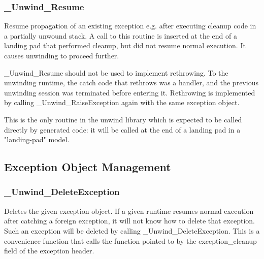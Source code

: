 \subsubsection{\_Unwind\_Resume}


Resume propagation of an existing exception e.g. after executing cleanup
code in a partially unwound stack. A call to this routine is inserted
at the end of a landing pad that performed cleanup, but did not resume
normal execution. It causes unwinding to proceed further.

\_Unwind\_Resume should not be used to implement rethrowing.  To the
unwinding runtime, the catch code that rethrows was a handler, and the
previous unwinding session was terminated before entering it. Rethrowing
is implemented by calling \_Unwind\_RaiseException again with the same
exception object.

This is the only routine in the unwind library which is expected 
to be called directly by generated code: it will be called at the 
end of a landing pad in a "landing-pad" model. 

\subsection{Exception Object Management}

\subsubsection{\_Unwind\_DeleteException}


Deletes the given exception object. If a given runtime resumes normal
execution after catching a foreign exception, it will not know how to
delete that exception. Such an exception will be deleted by calling
\_Unwind\_DeleteException. This is a convenience function that calls
the function pointed to by the exception\_cleanup field of the exception
header.

